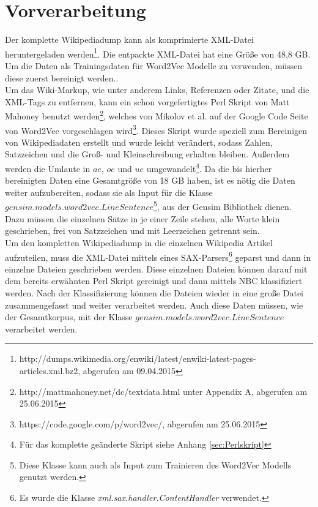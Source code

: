 \documentclass[12pt,a4paper]{report}
\begin{document}
	\section{Vorverarbeitung}
	\label{sec:Vorverarbeitung}
	Der komplette Wikipediadump kann als komprimierte XML-Datei heruntergeladen werden\footnote{http://dumps.wikimedia.org/enwiki/latest/enwiki-latest-pages-articles.xml.bz2, abgerufen am 09.04.2015}. Die entpackte XML-Datei hat eine Größe von 48,8 GB. Um die Daten als Trainingsdaten für Word2Vec Modelle zu verwenden, müssen diese zuerst bereinigt werden..\\		
	Um das Wiki-Markup, wie unter anderem Links, Referenzen oder Zitate, und die XML-Tags zu entfernen, kann ein schon vorgefertigtes Perl Skript von Matt Mahoney benutzt werden\footnote{http://mattmahoney.net/dc/textdata.html unter Appendix A, abgerufen am 25.06.2015}, welches von Mikolov et al. auf der Google Code Seite von Word2Vec vorgeschlagen wird\footnote{https://code.google.com/p/word2vec/, abgerufen am 25.06.2015}. Dieses Skript wurde speziell zum Bereinigen von Wikipediadaten erstellt und wurde leicht verändert, sodass Zahlen, Satzzeichen und die Groß- und Kleinschreibung erhalten bleiben. Außerdem werden die Umlaute in $ae$, $oe$ und $ue$ umgewandelt\footnote{Für das komplette geänderte Skript siehe Anhang \ref{sec:Perlskript}}. Da die bis hierher bereinigten Daten eine Gesamtgröße von 18 GB haben, ist es nötig die Daten weiter aufzubereiten, sodass sie als Input für die Klasse $gensim.models.word2vec.LineSentence$\footnote{Diese Klasse kann auch als Input zum Trainieren des Word2Vec Modells genutzt werden.}, aus der Gensim Bibliothek dienen. Dazu müssen die einzelnen Sätze in je einer Zeile stehen, alle Worte klein geschrieben, frei von Satzzeichen und mit Leerzeichen getrennt sein.\\	
	Um den kompletten Wikipediadump in die einzelnen Wikipedia Artikel aufzuteilen, muss die XML-Datei mittels eines SAX-Parsers\footnote{Es wurde die Klasse \textit{xml.sax.handler.ContentHandler} verwendet.} geparst und dann in einzelne Dateien geschrieben werden. Diese einzelnen Dateien können darauf mit dem bereits erwähnten Perl Skript gereinigt und dann mittels NBC klassifiziert werden. Nach der Klassifizierung können die Dateien wieder in eine große Datei zusammengefasst und weiter verarbeitet werden. Auch diese Daten müssen, wie der Gesamtkorpus, mit der Klasse $gensim.models.word2vec.LineSentence$ verarbeitet werden.
	
	
\newpage
\end{document}
